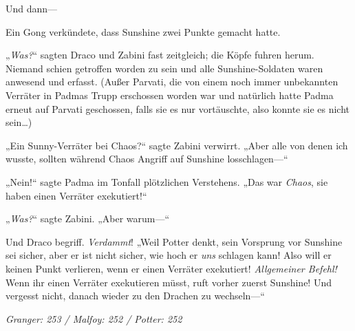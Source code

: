 Und dann—

Ein Gong verkündete, dass Sunshine zwei Punkte gemacht hatte.

„\emph{Was?}“ sagten Draco und Zabini fast zeitgleich; die Köpfe fuhren herum. Niemand schien getroffen worden zu sein und alle Sunshine-Soldaten waren anwesend und erfasst. (Außer Parvati, die von einem noch immer unbekannten Verräter in Padmas Trupp erschossen worden war und natürlich hatte Padma erneut auf Parvati geschossen, falls sie es nur vortäuschte, also konnte sie es nicht sein…)

„Ein Sunny-Verräter bei Chaos?“ sagte Zabini verwirrt. „Aber alle von denen ich wusste, sollten während Chaos Angriff auf Sunshine losschlagen—“

„Nein!“ sagte Padma im Tonfall plötzlichen Verstehens. „Das war \emph{Chaos}, sie haben einen Verräter exekutiert!“

„\emph{Was?}“ sagte Zabini. „Aber warum—“

Und Draco begriff. \emph{Verdammt}! „Weil Potter denkt, sein Vorsprung vor Sunshine sei sicher, aber er ist nicht sicher, wie hoch er \emph{uns} schlagen kann! Also will er keinen Punkt verlieren, wenn er einen Verräter exekutiert! \emph{Allgemeiner Befehl!} Wenn ihr einen Verräter exekutieren müsst, ruft vorher zuerst Sunshine! Und vergesst nicht, danach wieder zu den Drachen zu wechseln—“

\later

\emph{Granger: 253 / Malfoy: 252 / Potter: 252}


